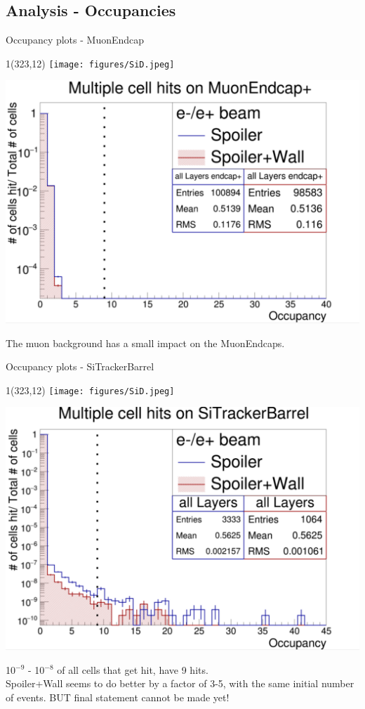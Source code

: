 \documentclass[xcolor={dvipsnames}]{beamer}
\newcommand{\sidlogo}{
  \setlength{\TPHorizModule}{1pt}
  \setlength{\TPVertModule}{1pt}
  \begin{textblock}{1}(323,12)
   \texttt{[image: figures/SiD.jpeg]}
  \end{textblock}
  }
\begin{document}
\subsection{Analysis - Occupancies}
\begin{frame}{Occupancy plots - \small MuonEndcap}
\sidlogo
 \begin{center}
\includegraphics[height=0.7\textheight]{Occupancy_MuonEndcap.pdf}
\end{center}
The muon background has a small impact on the MuonEndcaps.
\end{frame}
\begin{frame}{Occupancy plots - \small SiTrackerBarrel}
\sidlogo
 \begin{center}
\includegraphics[height=0.68\textheight]{Occupancy_SiTrackerBarrel.pdf}
\end{center}
\footnotesize 10$^{-9}$ - 10$^{-8}$ of all cells that get hit, have 9 hits.\\
\small Spoiler+Wall seems to do better by a factor of 3-5, with the same initial number of events. BUT final statement cannot be made yet!
\end{frame}
\end{document}
